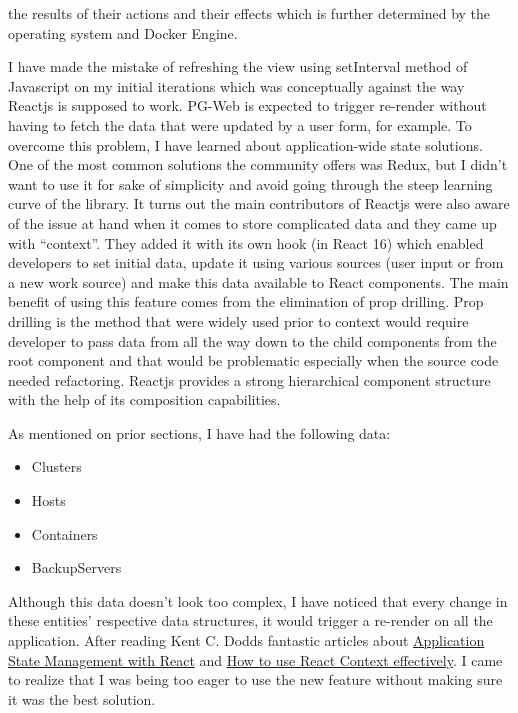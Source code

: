 the results of their actions and their effects which is further determined 
by the operating system and Docker Engine.
\par
I have made the mistake of refreshing the view using setInterval method of 
Javascript on my initial iterations which was conceptually against the way 
Reactjs is supposed to work. PG-Web is expected to trigger re-render without 
having to fetch the data that were updated by a user form, for example. To 
overcome this problem, I have learned about application-wide state solutions. 
One of the most common solutions the community offers was Redux, but I didn't 
want to use it for sake of simplicity and avoid going through the steep 
learning curve of the library. It turns out the main contributors of Reactjs 
were also aware of the issue at hand when it comes to store complicated data 
and they came up with ``context''. They added it with its own hook (in React 
16) which enabled developers to set initial data, update it using various 
sources (user input or from a new work source) and make this data available 
to React components. The main benefit of using this feature comes from the 
elimination of prop drilling. Prop drilling is the method that were widely 
used prior to context would require developer to pass data from all the way 
down to the child components from the root component and that would be 
problematic especially when the source code needed refactoring. Reactjs 
provides a strong hierarchical component structure with the help of its 
composition capabilities.
\par
As mentioned on prior sections, I have had the following data:
\begin{itemize}
    \item Clusters
    \item Hosts
    \item Containers
    \item BackupServers
\end{itemize}
Although this data doesn't look too complex, I have noticed that every change 
in these entities' respective data structures, it would trigger a re-render 
on all the application. After reading Kent C. Dodds fantastic articles 
about \href{https://kentcdodds.com/blog/application-state-management-with-react}
{Application State Management with React} and 
\href{https://kentcdodds.com/blog/how-to-use-react-context-effectively}
{How to use React Context effectively}. I came to realize that I was being too 
eager to use the new feature without making sure it was the best solution. 
